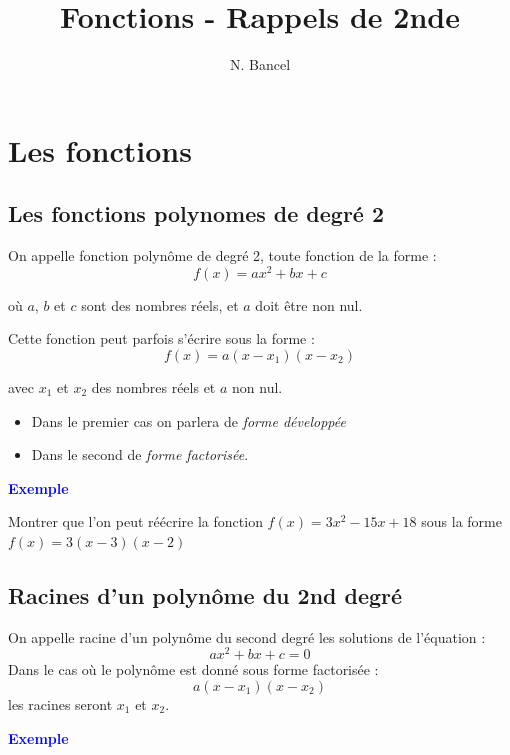\documentclass[a4paper,12pt]{article}
\begin{document}
\title{Fonctions - Rappels de 2nde}
\author{N. Bancel}

\maketitle

\section*{Les fonctions}



\subsection*{Les fonctions polynomes de degré 2}

On appelle fonction polynôme de degré 2, toute fonction de la forme :
\[
    f(x) = ax^2 + bx + c
\]


où $a$, $b$ et $c$ sont des nombres réels, et $a$ doit être non nul.

Cette fonction peut parfois s'écrire sous la forme : 
\[
    f(x) = a(x - x_1)(x - x_2)
\]

avec $x_1$ et $x_2$ des nombres réels et $a$ non nul.

\begin{itemize}[noitemsep]
  \item Dans le premier cas on parlera de \textit{forme développée}
  \item Dans le second de \textit{forme factorisée}.
\end{itemize}


\textbf{\textcolor{blue}{Exemple}} \par 

Montrer que l'on peut réécrire la fonction $f(x) = 3x^2 - 15x + 18$ sous la forme $f(x) = 3(x - 3)(x - 2)$

\subsection*{Racines d'un polynôme du 2nd degré}

On appelle racine d'un polynôme du second degré les solutions de l'équation :
\[
    ax^2 + bx + c = 0
\]
Dans le cas où le polynôme est donné sous forme factorisée :
\[
    a(x - x_1)(x - x_2)
\]
les racines seront $x_1$ et $x_2$.


\textbf{\textcolor{blue}{Exemple}} \par
\end{document}
